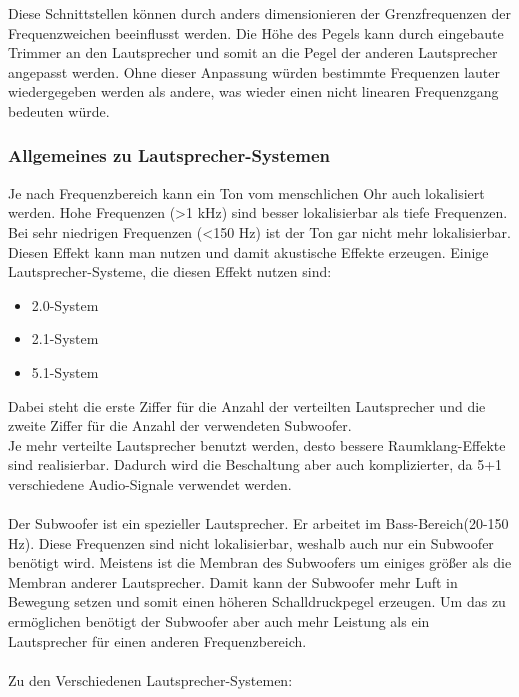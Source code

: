Diese Schnittstellen können durch anders dimensionieren der Grenzfrequenzen der Frequenzweichen beeinflusst werden.
Die Höhe des Pegels kann durch eingebaute Trimmer an den Lautsprecher und somit an die Pegel der anderen Lautsprecher angepasst werden.
Ohne dieser Anpassung würden bestimmte Frequenzen lauter wiedergegeben werden als andere, was wieder einen nicht linearen Frequenzgang bedeuten würde.

\newpage
\subsubsection*{Allgemeines zu Lautsprecher-Systemen}
Je nach Frequenzbereich kann ein Ton vom menschlichen Ohr auch lokalisiert \mbox{werden}.
Hohe Frequenzen (>1 kHz) sind besser lokalisierbar als tiefe Frequenzen.
Bei sehr niedrigen Frequenzen (<150 Hz) ist der Ton gar nicht mehr lokalisierbar.
Diesen \mbox{Effekt} kann man nutzen und damit akustische Effekte erzeugen.
Einige Lautsprecher-Systeme, die diesen Effekt nutzen sind:
\begin{itemize}
	\item 2.0-System
	\item 2.1-System
	\item 5.1-System
\end{itemize}
Dabei steht die erste Ziffer für die Anzahl der verteilten Lautsprecher und die zweite Ziffer für die Anzahl der verwendeten Subwoofer.
\\
Je mehr verteilte Lautsprecher benutzt werden, desto bessere Raumklang-Effekte sind realisierbar.
Dadurch wird die Beschaltung aber auch komplizierter, da 5+1 verschiedene Audio-Signale verwendet werden.
\\ \\
Der Subwoofer ist ein spezieller Lautsprecher.
Er arbeitet im Bass-Bereich(20-150 Hz).
Diese Frequenzen sind nicht lokalisierbar, weshalb auch nur ein Subwoofer benötigt wird.
Meistens ist die Membran des Subwoofers um einiges größer als die Membran anderer Lautsprecher.
Damit kann der Subwoofer mehr Luft in Bewegung setzen und somit einen höheren Schalldruckpegel erzeugen.
Um das zu ermöglichen benötigt der Subwoofer aber auch mehr Leistung als ein Lautsprecher für einen anderen Frequenzbereich.
\\ \\

\newpage
Zu den Verschiedenen Lautsprecher-Systemen:
